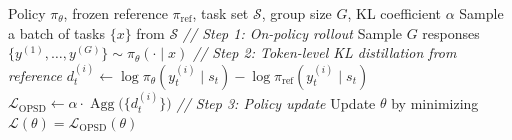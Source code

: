 \documentclass{llmxive}
\providecommand{\mycomment}[1]{\textit{// #1}}
\begin{document}
\begin{algorithm}[t]
  \caption{OPSD}
  \label{alg:opsd}
  \begin{algorithmic}[1]
  \Require Policy $\pi_{\theta}$, frozen reference $\pi_{\mathrm{ref}}$, task set
  $\mathcal{S}$, group size $G$, KL coefficient $\alpha$
      \State Sample a batch of tasks $\{x\}$ from $\mathcal{S}$
          \State \mycomment{Step 1: On-policy rollout}
          \State Sample $G$ responses $\{y^{(1)},\dots,y^{(G)}\} \sim \pi_{\theta}(\cdot \mid
  x)$
          \State \mycomment{Step 2: Token-level KL distillation from reference}
                  \State $d_t^{(i)} \gets \log\pi_{\theta}(y_t^{(i)} \mid s_t) -
  \log\pi_{\mathrm{ref}}(y_t^{(i)} \mid s_t)$
              \EndFor
          \EndFor
          \State $\mathcal{L}_{\mathrm{OPSD}} \gets
  \alpha \cdot \operatorname{Agg}\!\bigl(\{d_t^{(i)}\}\bigr)$
          \State \mycomment{Step 3: Policy update}
          \State Update $\theta$ by minimizing $\mathcal{L}(\theta) =
  \mathcal{L}_{\mathrm{OPSD}}(\theta)$
      \EndFor
  \EndFor
  \end{algorithmic}
\end{algorithm}
\end{document}

